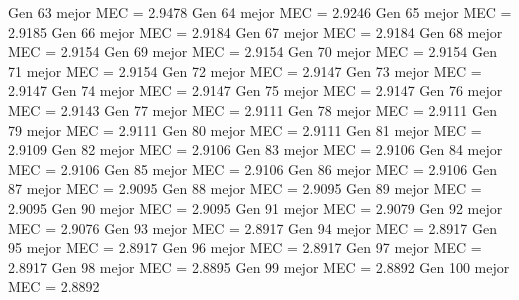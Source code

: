 Gen 63 mejor MEC = 2.9478
Gen 64 mejor MEC = 2.9246
Gen 65 mejor MEC = 2.9185
Gen 66 mejor MEC = 2.9184
Gen 67 mejor MEC = 2.9184
Gen 68 mejor MEC = 2.9154
Gen 69 mejor MEC = 2.9154
Gen 70 mejor MEC = 2.9154
Gen 71 mejor MEC = 2.9154
Gen 72 mejor MEC = 2.9147
Gen 73 mejor MEC = 2.9147
Gen 74 mejor MEC = 2.9147
Gen 75 mejor MEC = 2.9147
Gen 76 mejor MEC = 2.9143
Gen 77 mejor MEC = 2.9111
Gen 78 mejor MEC = 2.9111
Gen 79 mejor MEC = 2.9111
Gen 80 mejor MEC = 2.9111
Gen 81 mejor MEC = 2.9109
Gen 82 mejor MEC = 2.9106
Gen 83 mejor MEC = 2.9106
Gen 84 mejor MEC = 2.9106
Gen 85 mejor MEC = 2.9106
Gen 86 mejor MEC = 2.9106
Gen 87 mejor MEC = 2.9095
Gen 88 mejor MEC = 2.9095
Gen 89 mejor MEC = 2.9095
Gen 90 mejor MEC = 2.9095
Gen 91 mejor MEC = 2.9079
Gen 92 mejor MEC = 2.9076
Gen 93 mejor MEC = 2.8917
Gen 94 mejor MEC = 2.8917
Gen 95 mejor MEC = 2.8917
Gen 96 mejor MEC = 2.8917
Gen 97 mejor MEC = 2.8917
Gen 98 mejor MEC = 2.8895
Gen 99 mejor MEC = 2.8892
Gen 100 mejor MEC = 2.8892

